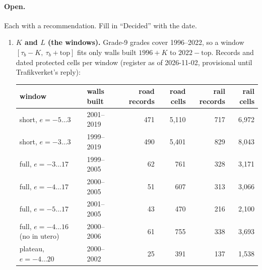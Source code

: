 \documentclass[11pt]{article}
\begin{document}
\paragraph{Open.} Each with a recommendation. Fill in ``Decided'' with the date.
\begin{enumerate}
\item \textbf{\(K\) and \(L\) (the windows).} Grade-9 grades cover 1996--2022, so a window
  \([\tau_b - K,\ \tau_b + \text{top}]\) fits only walls built \(1996 + K\) to
  \(2022 - \text{top}\). Records and dated protected cells per window (register as of
  2026-11-02, provisional until Trafikverket's reply):

  \smallskip
  {\footnotesize
  \begin{tabular}{@{}llrrrr@{}}
  \toprule
  window & walls built & road records & road cells & rail records & rail cells \\
  \midrule
  short, \(e = -5 \dots 3\) & 2001--2019 & 471 & 5,110 & 717 & 6,972 \\
  short, \(e = -3 \dots 3\) & 1999--2019 & 490 & 5,401 & 829 & 8,043 \\
  full, \(e = -3 \dots 17\) & 1999--2005 & 62 & 761 & 328 & 3,171 \\
  full, \(e = -4 \dots 17\) & 2000--2005 & 51 & 607 & 313 & 3,066 \\
  full, \(e = -5 \dots 17\) & 2001--2005 & 43 & 470 & 216 & 2,100 \\
  full, \(e = -4 \dots 16\) (no in utero) & 2000--2006 & 61 & 755 & 338 & 3,693 \\
  plateau, \(e = -4 \dots 20\) & 2000--2002 & 25 & 391 & 137 & 1,538 \\
  \bottomrule
  \end{tabular}}
  \smallskip


\end{enumerate}
\end{document}
